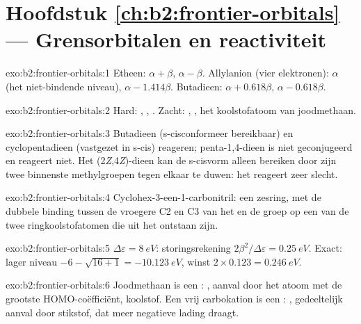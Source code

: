 \section*{Hoofdstuk \ref{ch:b2:frontier-orbitals} --- Grensorbitalen en reactiviteit}

\begin{solution}{exo:b2:frontier-orbitals:1}
Etheen:  $\alpha + \beta$,  $\alpha - \beta$. Allylanion (vier elektronen):  $\alpha$ (het
niet-bindende niveau),  $\alpha - 1.414\beta$. Butadieen:  $\alpha + 0.618\beta$,  $\alpha -
0.618\beta$.
\end{solution}

\begin{solution}{exo:b2:frontier-orbitals:2}
Hard: , , . Zacht: , , het koolstofatoom van joodmethaan.
\end{solution}

\begin{solution}{exo:b2:frontier-orbitals:3}
Butadieen (s-cisconformeer bereikbaar) en cyclopentadieen (vastgezet in s-cis) reageren;
penta-1,4-dieen is niet geconjugeerd en reageert niet. Het (2\textit{Z},4\textit{Z})-dieen kan
de s-cisvorm alleen bereiken door zijn twee binnenste methylgroepen tegen elkaar te duwen: het
reageert zeer slecht.
\end{solution}

\begin{solution}{exo:b2:frontier-orbitals:4}
Cyclohex-3-een-1-carbonitril: een zesring, met de dubbele binding tussen de vroegere C2
en C3 van het  en de groep  op een van de twee ringkoolstofatomen die uit het
 ontstaan zijn.
\end{solution}

\begin{solution}{exo:b2:frontier-orbitals:5}
$\Delta\varepsilon = \qty{8}{eV}$: storingsrekening $2\beta^2/\Delta\varepsilon = \qty{0.25}{eV}$. Exact: lager niveau
$-6 - \sqrt{16 + 1} = \qty{-10.123}{eV}$, winst $2 \times 0.123 = \qty{0.246}{eV}$.
\end{solution}

\begin{solution}{exo:b2:frontier-orbitals:6}
Joodmethaan is een : , aanval door het atoom met de grootste
HOMO-coëfficiënt, koolstof. Een vrij carbokation is een : ,
gedeeltelijk aanval door stikstof, dat meer negatieve lading draagt.
\end{solution}

